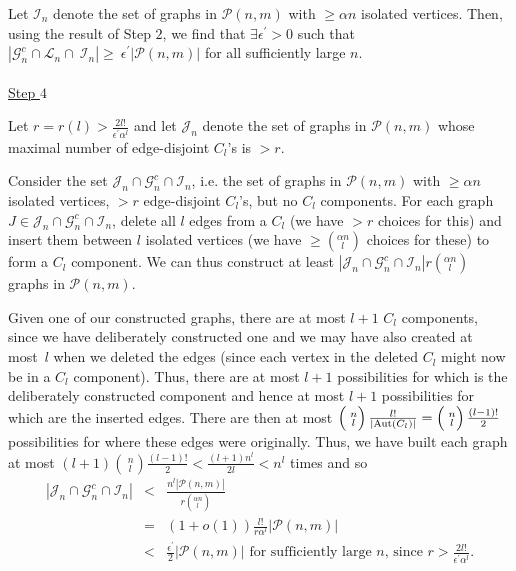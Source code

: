 \documentclass{article}
\newtheorem{Proof of Theorem}{Proof of Theorem}
\begin{document}
Let $\mathcal{I}_{n}$ denote the set of graphs in $\mathcal{P}(n,m)$ with $\geq \alpha n$ isolated vertices.
Then, using the result of Step $2$, 
we find that $\exists \epsilon^{\prime} \!>\! 0$ such that
$|\mathcal{G}_{n}^{c} \cap \mathcal{L}_{n} \cap~\!\mathcal{I}_{n}| \!\geq~\!\!\epsilon^{\prime} |\mathcal{P}(n,m)|$
for all sufficiently large $n$. \\
\\
\underline{Step $4$}

Let $r=r(l)> \frac{2l!}{\epsilon^{\prime}\alpha^{l}}$ 
and let $\mathcal{J}_{n}$ denote the set of graphs in $\mathcal{P}(n,m)$ 
whose maximal number of edge-disjoint $C_{l}$'s is $>r$.

Consider the set $\mathcal{J}_{n} \cap \mathcal{G}_{n}^{c} \cap \mathcal{I}_{n}$,
i.e. the set of graphs in $\mathcal{P}(n,m)$ with $\geq \alpha n$ isolated vertices,
$>r$ edge-disjoint $C_{l}$'s,
but no $C_{l}$ components.
For each graph $J \in \mathcal{J}_{n} \cap \mathcal{G}_{n}^{c} \cap \mathcal{I}_{n}$,
delete all $l$ edges from a $C_{l}$ 
(we have $>r$ choices for this)
and insert them between $l$ isolated vertices
(we have $\geq \left( ^{\alpha n}_{\phantom{q}l} \right)$ choices for these)
to form a $C_{l}$ component.
We can thus construct at least 
$|\mathcal{J}_{n} \cap \mathcal{G}_{n}^{c} \cap \mathcal{I}_{n}| r \left( ^{\alpha n}_{\phantom{q}l} \right)$
graphs in $\mathcal{P}(n,m)$.

Given one of our constructed graphs,
there are at most $l+1$ $C_{l}$ components,
since we have deliberately constructed one and we may have also created at most~$l$ when we deleted the edges
(since each vertex in the deleted $C_{l}$ might now be in a $C_{l}$ component).
Thus, there are at most $l+1$ possibilities for which is the deliberately constructed component
and hence at most $l+1$ possibilities for which are the inserted edges.
There are then at most 
$\left( ^{\phantom{i}n}_{\phantom{q}l} \right) \frac{l!}{|\textrm{\scriptsize{Aut}}(C_{l})|} = 
\left( ^{\phantom{i}n}_{\phantom{q}l} \right) \frac{(l-1)!}{2}$
possibilities for where these edges were originally.
Thus, we have built each graph at most
$(l+1) \left( ^{\phantom{i}n}_{\phantom{q}l} \right) \frac{(l-1)!}{2} < \frac{(l+1)n^{l}}{2l} < n^{l}$ times
and so 
\begin{eqnarray*}
|\mathcal{J}_{n} \cap \mathcal{G}_{n}^{c} \cap \mathcal{I}_{n}|
& < & \frac{n^{l} |\mathcal{P}(n,m)|}{ r \left( ^{\alpha n}_{\phantom{q}l} \right)} \\
& = & (1+o(1)) \frac{l!}{r \alpha ^{l}} |\mathcal{P}(n,m)| \\
& < & \frac{\epsilon^{\prime}}{2} |\mathcal{P}(n,m)| 
\textrm{ for sufficiently large $n$, since } r > \frac{2l!}{\epsilon^{\prime} \alpha^{l}}. 
\end{eqnarray*}
\end{document}
